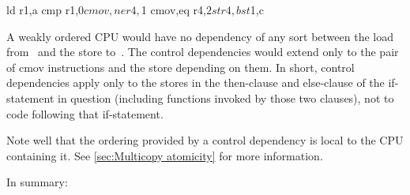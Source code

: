 \begin{VerbatimU}
	ld r1,a
	cmp r1,$0
	cmov,ne r4,$1
	cmov,eq r4,$2
	st r4,b
	st $1,c
\end{VerbatimU}

A weakly ordered CPU would have no dependency of any sort between the load
from~ and the store to~.
The control dependencies would extend only to the pair of cmov
instructions and the store depending on them.
In short, control dependencies apply only to the stores in the then-clause
and else-clause of the if-statement in question (including functions
invoked by those two clauses), not to code following that if-statement.


Note well that the ordering provided by a control dependency is local
to the CPU containing it.
See \cref{sec:Multicopy atomicity} for more information.


In summary:

